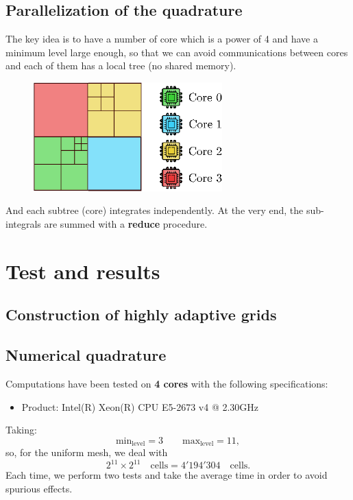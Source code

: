 \documentclass[8pt]{beamer}
\begin{document}
\subsection{Parallelization of the quadrature}
\begin{frame}

The key idea is to have a number of core which is a power of 4 and have a minimum level large enough, so that we can avoid communications between cores and each of them has a local tree (no shared memory).
 \begin{figure}[!h]
\begin{center}
\includegraphics[width=0.65\textwidth]{./figures/parallel_integration.eps}
\end{center}
\end{figure}

And each subtree (core) integrates independently. At the very end, the sub-integrals are summed with a \textbf{reduce} procedure.
\end{frame}
\section{Test and results}
\subsection{Construction of highly adaptive grids}

\subsection{Numerical quadrature}

\begin{frame}
Computations have been tested on \textbf{4 cores} with the following specifications:
\begin{itemize}
 \item Product: Intel(R) Xeon(R) CPU E5-2673 v4 @ 2.30GHz
\end{itemize}
Taking:
\begin{equation*}
 \text{min}_{\text{level}} = 3 \qquad \text{max}_{\text{level}} = 11,
\end{equation*}
so, for the uniform mesh, we deal with
\begin{equation*}
 2^{11} \times 2^{11} \quad \text{cells} = 4'194'304 \quad \text{cells}.
\end{equation*}
Each time, we perform two tests and take the average time in order to avoid spurious effects.
\end{frame}
\end{document}
